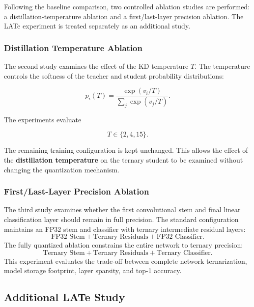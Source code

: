 \documentclass[conference]{IEEEtran}
\begin{document}
Following the baseline comparison, two controlled ablation studies are
performed: a distillation-temperature ablation and a first/last-layer
precision ablation. The LATe experiment is treated separately as an
additional study.

\subsubsection{Distillation Temperature Ablation}

The second study examines the effect of the KD temperature $T$. The
temperature controls the softness of the teacher and student
probability distributions:

\begin{equation}
p_i(T)
=
\frac{\exp(v_i/T)}
{\sum_j\exp(v_j/T)}.
\end{equation}

The experiments evaluate

\[
T\in\{2,4,15\}.
\]

The remaining training configuration is kept unchanged. This allows
the effect of the \textbf{distillation temperature} on the ternary
student to be examined without changing the quantization mechanism.

\subsubsection{First/Last-Layer Precision Ablation}

The third study examines whether the first convolutional stem and final
linear classification layer should remain in full precision. The
standard configuration maintains an FP32 stem and classifier with
ternary intermediate residual layers:
\begin{equation}
\text{FP32 Stem} + \text{Ternary Residuals} + \text{FP32 Classifier}.
\end{equation}
The fully quantized ablation constrains the entire network to ternary
precision:
\begin{equation}
\text{Ternary Stem} + \text{Ternary Residuals} + \text{Ternary Classifier}.
\end{equation}
This experiment evaluates the trade-off between complete network
ternarization, model storage footprint, layer sparsity, and top-1
accuracy.


\subsection{Additional LATe Study}
\end{document}
